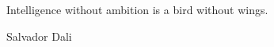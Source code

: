 \newpage
\null\vfill
\begin{flushright}
\begin{minipage}{9.0cm}

Intelligence without ambition is a bird without wings.

\end{minipage}
\end{flushright}


\begin{flushright}
Salvador Dali
\end{flushright}

\newpage %

\null
